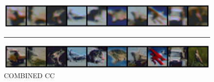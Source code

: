 \begin{figure}
    \centerline{\hspace*{8mm}\includegraphics[width=1.4\textwidth]{figures/reconstruction_CIFAR10_RP_ReLU_CC_epoch_100.png}}
    \caption*{\normalsize{COMBINED CC}}
    \rule{0.4\textwidth}{.4pt}
    
    \centerline{\hspace*{8mm}\includegraphics[width=1.4\textwidth]{figures/reconstruction_CIFAR10_COMBINED_CC_epoch_100.png}}
\end{figure}




